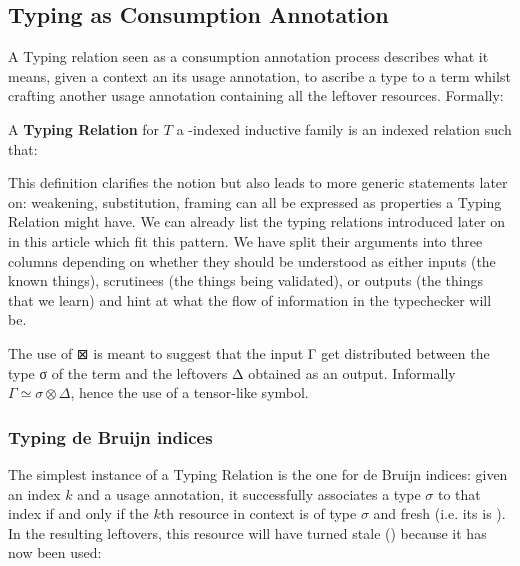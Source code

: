 \documentclass[a4paper,UKenglish]{lipics-v2016}
\begin{document}
\subsection{Typing as Consumption Annotation}

A Typing relation seen as a consumption annotation process describes
what it means, given a context an its usage annotation, to ascribe a
type to a term whilst crafting another usage annotation containing all
the leftover resources. Formally:

\begin{definition}
\label{definition:typing}
A \textbf{Typing Relation} for $T$ a \Nat{}-indexed inductive family is
an indexed relation  such that:
\end{definition}

This definition clarifies the notion but also leads to more generic
statements later on: weakening, substitution, framing can all be
expressed as properties a Typing Relation might have. We can already
list the typing relations introduced later on in this article which
fit this pattern. We have split their arguments into three columns
depending on whether they should be understood as either inputs (the
known things), scrutinees (the things being validated), or outputs
(the things that we learn) and hint at what the flow of information
in the typechecker will be.



\begin{remark}The use of ⊠ is meant to suggest that the input Γ
get distributed between the type σ of the term and the leftovers
Δ obtained as an output. Informally $Γ \simeq σ ⊗ Δ$, hence the
use of a tensor-like symbol.
\end{remark}

\subsubsection{Typing de Bruijn indices}

The simplest instance of a Typing Relation is the one for de Bruijn
indices: given an index $k$ and a usage annotation, it successfully
associates a type $σ$ to that index if and only if the $k$th resource
in context is of type $σ$ and fresh (i.e. its  is ).
In the resulting leftovers, this resource will have turned stale ()
because it has now been used:
\end{document}
